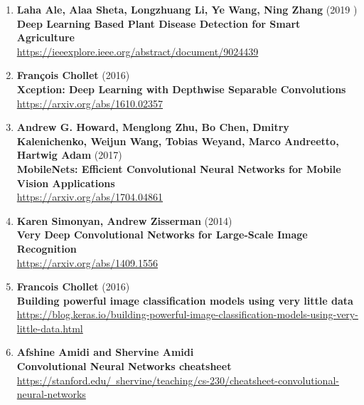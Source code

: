 \begin{enumerate}
    \item \textbf{Laha Ale, Alaa Sheta, Longzhuang Li, Ye Wang, Ning Zhang} (2019 ) \\
        \textbf{Deep Learning Based Plant Disease Detection for Smart Agriculture} \\
        \href{https://ieeexplore.ieee.org/abstract/document/9024439}{https://ieeexplore.ieee.org/abstract/document/9024439} \\

    \item \textbf{François Chollet} (2016) \\
        \textbf{Xception: Deep Learning with Depthwise Separable Convolutions}\\
        \href{https://arxiv.org/abs/1610.02357}{https://arxiv.org/abs/1610.02357}\\

     \item \textbf{Andrew G. Howard, Menglong Zhu, Bo Chen, Dmitry Kalenichenko, Weijun Wang, Tobias Weyand, Marco Andreetto, Hartwig Adam} (2017) \\
        \textbf{MobileNets: Efficient Convolutional Neural Networks for Mobile Vision Applications} \\
        \href{https://arxiv.org/abs/1704.04861}{https://arxiv.org/abs/1704.04861}\\

    \item \textbf{Karen Simonyan, Andrew Zisserman} (2014) \\
        \textbf{Very Deep Convolutional Networks for Large-Scale Image Recognition} \\
        \href{https://arxiv.org/abs/1409.1556}{https://arxiv.org/abs/1409.1556}

    \item \textbf{Francois Chollet} (2016) \\
        \textbf{Building powerful image classification models using very little data} \\
        \href{https://blog.keras.io/building-powerful-image-classification-models-using-very-little-data.html}{https://blog.keras.io/building-powerful-image-classification-models-using-very-little-data.html} \\

    \item \textbf{Afshine Amidi and Shervine Amidi}  \\
        \textbf{Convolutional Neural Networks cheatsheet} \\
        \href{https://stanford.edu/~shervine/teaching/cs-230/cheatsheet-convolutional-neural-networks}{https://stanford.edu/~shervine/teaching/cs-230/cheatsheet-convolutional-neural-networks} \\


\end{enumerate}
